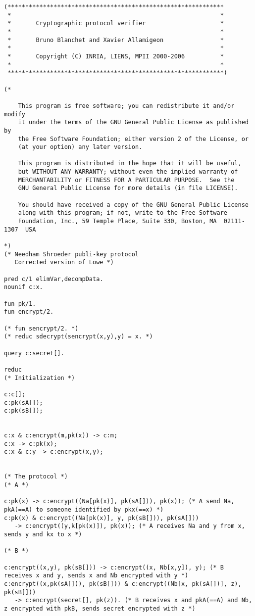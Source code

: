 \documentclass[a4paper, 12pt]{report}
\begin{document}
        \begin{lstlisting}[frame=single]
(*************************************************************
 *                                                           *
 *       Cryptographic protocol verifier                     *
 *                                                           *
 *       Bruno Blanchet and Xavier Allamigeon                *
 *                                                           *
 *       Copyright (C) INRIA, LIENS, MPII 2000-2006          *
 *                                                           *
 *************************************************************)

(*

    This program is free software; you can redistribute it and/or modify
    it under the terms of the GNU General Public License as published by
    the Free Software Foundation; either version 2 of the License, or
    (at your option) any later version.

    This program is distributed in the hope that it will be useful,
    but WITHOUT ANY WARRANTY; without even the implied warranty of
    MERCHANTABILITY or FITNESS FOR A PARTICULAR PURPOSE.  See the
    GNU General Public License for more details (in file LICENSE).

    You should have received a copy of the GNU General Public License
    along with this program; if not, write to the Free Software
    Foundation, Inc., 59 Temple Place, Suite 330, Boston, MA  02111-1307  USA

*)
(* Needham Shroeder publi-key protocol
   Corrected version of Lowe *)

pred c/1 elimVar,decompData.
nounif c:x.

fun pk/1.
fun encrypt/2.

(* fun sencrypt/2. *)
(* reduc sdecrypt(sencrypt(x,y),y) = x. *)

query c:secret[].

reduc
(* Initialization *)

c:c[];
c:pk(sA[]);
c:pk(sB[]);


c:x & c:encrypt(m,pk(x)) -> c:m;
c:x -> c:pk(x);
c:x & c:y -> c:encrypt(x,y);


(* The protocol *)
(* A *)

c:pk(x) -> c:encrypt((Na[pk(x)], pk(sA[])), pk(x)); (* A send Na, pkA(==A) to someone identified by pkx(==x) *)
c:pk(x) & c:encrypt((Na[pk(x)], y, pk(sB[])), pk(sA[]))
   -> c:encrypt((y,k[pk(x)]), pk(x)); (* A receives Na and y from x, sends y and kx to x *)

(* B *)

c:encrypt((x,y), pk(sB[])) -> c:encrypt((x, Nb[x,y]), y); (* B receives x and y, sends x and Nb encrypted with y *)
c:encrypt((x,pk(sA[])), pk(sB[])) & c:encrypt((Nb[x, pk(sA[])], z), pk(sB[]))
   -> c:encrypt(secret[], pk(z)). (* B receives x and pkA(==A) and Nb, z encrypted with pkB, sends secret encrypted with z *)
        \end{lstlisting}
\end{document}
